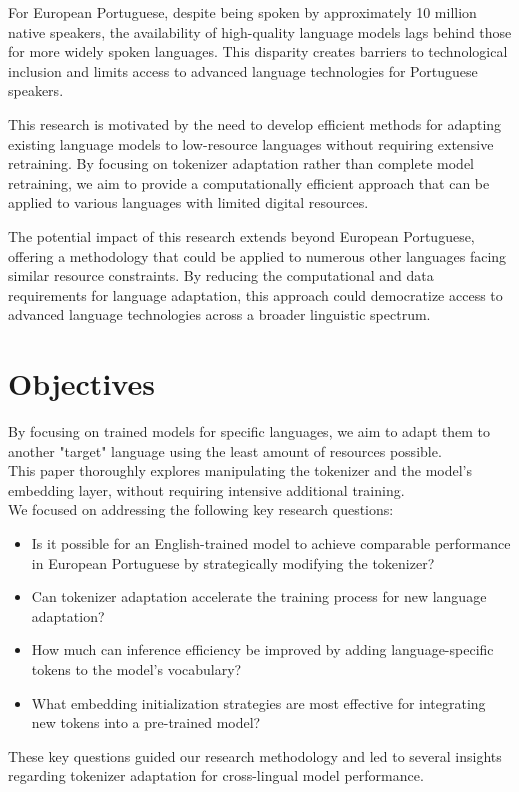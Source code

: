 For European Portuguese, despite being spoken by approximately 10 million native speakers, the availability of high-quality language models lags behind those for more widely spoken languages. This disparity creates barriers to technological inclusion and limits access to advanced language technologies for Portuguese speakers.

This research is motivated by the need to develop efficient methods for adapting existing language models to low-resource languages without requiring extensive retraining. By focusing on tokenizer adaptation rather than complete model retraining, we aim to provide a computationally efficient approach that can be applied to various languages with limited digital resources.

The potential impact of this research extends beyond European Portuguese, offering a methodology that could be applied to numerous other languages facing similar resource constraints. By reducing the computational and data requirements for language adaptation, this approach could democratize access to advanced language technologies across a broader linguistic spectrum.

\section{Objectives}\label{Section1.2}
By focusing on trained models for specific languages, we aim to adapt them to another "target" language using the least amount of resources possible.\\
This paper thoroughly explores manipulating the tokenizer  and the model's embedding layer, without requiring intensive additional training.\\

We focused on addressing the following key research questions:
\begin{itemize}
    \item Is it possible for an English-trained model to achieve comparable performance in European Portuguese by strategically modifying the tokenizer?
    \item Can tokenizer adaptation accelerate the training process for new language adaptation?
    \item How much can inference efficiency be improved by adding language-specific tokens to the model's vocabulary?
    \item What embedding initialization strategies are most effective for integrating new tokens into a pre-trained model?
\end{itemize}
These key questions guided our research methodology and led to several insights regarding tokenizer adaptation for cross-lingual model performance.

